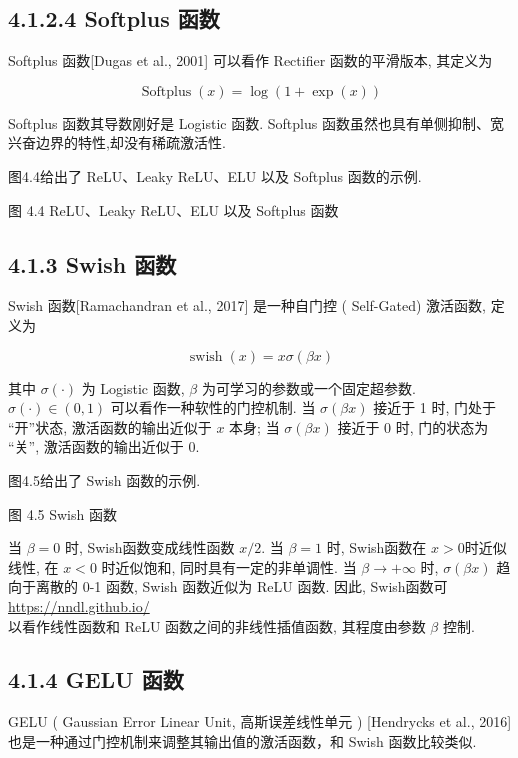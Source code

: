 \documentclass[10pt]{article}
\begin{document}
\subsection*{4.1.2.4 Softplus 函数}
Softplus 函数[Dugas et al., 2001] 可以看作 Rectifier 函数的平滑版本, 其定义为


\begin{equation*}
\operatorname{Softplus}(x)=\log (1+\exp (x)) \tag{4.25}
\end{equation*}


Softplus 函数其导数刚好是 Logistic 函数. Softplus 函数虽然也具有单侧抑制、宽兴奋边界的特性,却没有稀疏激活性.

图4.4给出了 ReLU、Leaky ReLU、ELU 以及 Softplus 函数的示例.



图 4.4 ReLU、Leaky ReLU、ELU 以及 Softplus 函数

\subsection*{4.1.3 Swish 函数}
Swish 函数[Ramachandran et al., 2017] 是一种自门控 ( Self-Gated) 激活函数, 定义为


\begin{equation*}
\operatorname{swish}(x)=x \sigma(\beta x) \tag{4.26}
\end{equation*}


其中 $\sigma(\cdot)$ 为 Logistic 函数, $\beta$ 为可学习的参数或一个固定超参数. $\sigma(\cdot) \in(0,1)$ 可以看作一种软性的门控机制. 当 $\sigma(\beta x)$ 接近于 1 时, 门处于 “开”状态, 激活函数的输出近似于 $x$ 本身; 当 $\sigma(\beta x)$ 接近于 0 时, 门的状态为 “关”, 激活函数的输出近似于 0.

图4.5给出了 Swish 函数的示例.



图 4.5 Swish 函数

当 $\beta=0$ 时, Swish函数变成线性函数 $x / 2$. 当 $\beta=1$ 时, Swish函数在 $x>0$时近似线性, 在 $x<0$ 时近似饱和, 同时具有一定的非单调性. 当 $\beta \rightarrow+\infty$ 时, $\sigma(\beta x)$ 趋向于离散的 0-1 函数, Swish 函数近似为 ReLU 函数. 因此, Swish函数可 \href{https://nndl.github.io/}{https://nndl.github.io/}\\
以看作线性函数和 ReLU 函数之间的非线性插值函数, 其程度由参数 $\beta$ 控制.

\subsection*{4.1.4 GELU 函数}
GELU ( Gaussian Error Linear Unit, 高斯误差线性单元 ) [Hendrycks et al., 2016] 也是一种通过门控机制来调整其输出值的激活函数，和 Swish 函数比较类似.
\end{document}
